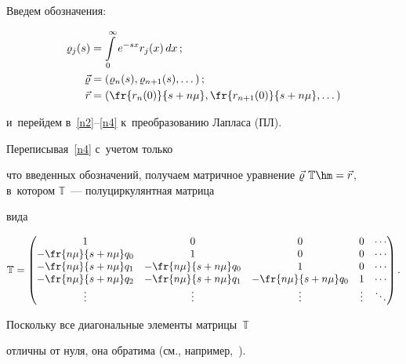 Введем обозначения: 

\begin{align*}

\varrho_j(s)&=\int\limits_0^\infty e^{-sx} r_j(x) \, dx\,;\\

\vec \varrho&= \left(\varrho_n(s), \varrho_{n+1}(s), \dots \right );\\

\vec r&=\left(\fr{r_n(0)}{s+n \mu}, \fr{r_{n+1}(0)}{s+n \mu}, \dots \right )

\end{align*}

и~перейдем в~\eqref{n2}--\eqref{n4} к~преобразованию Лапласа (ПЛ).

Переписывая~\eqref{n4} с~учетом только

что введенных обозначений, получаем матричное уравнение ${{\vec \varrho} \, 

\,\mathbb{T}\hm={\vec r}}$, в~котором $\mathbb{T}$~--- полуциркулянтная мат\-ри\-ца~\cite[с.~14]{HEN} 

вида

$$

\mathbb{T}

= \begin{pmatrix}

1 & 0 & 0 & 0 & \cdots \\

-\fr{n\mu}{s+n\mu}

q_0 & 1 & 0 & 0 & \cdots \\

-\fr{n\mu}{s+n\mu}

q_1 & -\fr{n\mu}{s+n\mu}

q_0 & 1 & 0 & \cdots\\

-\fr{n\mu}{{s+n\mu}}

q_2 & -\fr{n\mu}{{s+n\mu}}

q_1 & -\fr{n\mu}{{s+n\mu}}

q_0 & 1 & \cdots \\

\vdots & \vdots & \vdots

 & \vdots & \ddots \\

\end{pmatrix}.

$$

Поскольку все диагональные элементы мат\-ри\-цы~$\mathbb{T}$

отличны от нуля, она обратима (см., например,~\cite[теорема~1.3]{HEN}).

